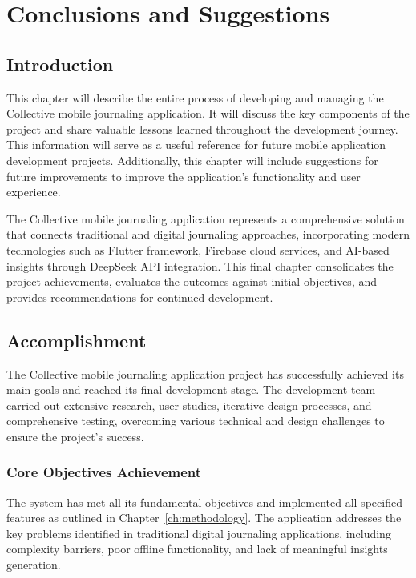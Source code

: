 \chapter{Conclusions and Suggestions}\label{ch:conclusions}

\section{Introduction}\label{sec:conclusionsIntroduction}

This chapter will describe the entire process of developing and managing the Collective mobile journaling application. It will discuss the key components of the project and share valuable lessons learned throughout the development journey. This information will serve as a useful reference for future mobile application development projects. Additionally, this chapter will include suggestions for future improvements to improve the application's functionality and user experience.

The Collective mobile journaling application represents a comprehensive solution that connects traditional and digital journaling approaches, incorporating modern technologies such as Flutter framework, Firebase cloud services, and AI-based insights through DeepSeek API integration. This final chapter consolidates the project achievements, evaluates the outcomes against initial objectives, and provides recommendations for continued development.

\section{Accomplishment}\label{sec:accomplishment}

The Collective mobile journaling application project has successfully achieved its main goals and reached its final development stage. The development team carried out extensive research, user studies, iterative design processes, and comprehensive testing, overcoming various technical and design challenges to ensure the project's success.

\subsection{Core Objectives Achievement}

The system has met all its fundamental objectives and implemented all specified features as outlined in Chapter~\ref{ch:methodology}. The application addresses the key problems identified in traditional digital journaling applications, including complexity barriers, poor offline functionality, and lack of meaningful insights generation.

